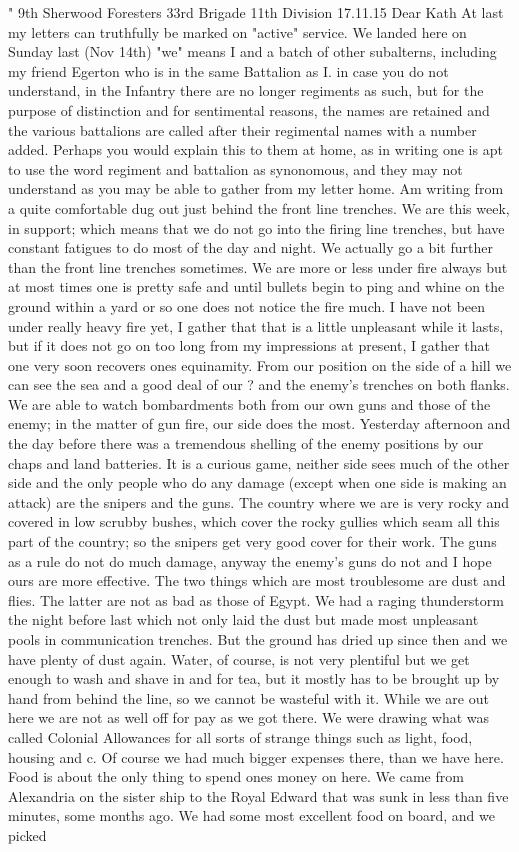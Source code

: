 " 9th Sherwood Foresters
    33rd Brigade
    11th Division 17.11.15
Dear Kath
    At last my letters can truthfully be marked on "active" service. We landed here on Sunday last (Nov 14th) "we" means I and a batch of other subalterns, including my friend Egerton who is in the same Battalion as I. in case you do not understand, in the Infantry there are no longer regiments as such, but for the purpose of distinction and for sentimental reasons, the names are retained and the various battalions are called after their regimental names with a number added. Perhaps you would explain this to them at home, as in writing one is apt to use the word regiment and battalion as synonomous, and they may not understand as you may be able to gather from my letter home. Am writing from a quite comfortable dug out just behind the front line trenches. We are this week, in support; which means that we do not go into the firing line trenches, but have constant fatigues to do most of the day and night. We actually go a bit further than the front line trenches sometimes. We are more or less under fire always but at most times one is pretty safe and until bullets begin to ping and whine on the ground within a yard or so one does not notice the fire much. I have not been under really heavy fire yet, I gather that that is a little unpleasant while it lasts, but if it does not go on too long from my impressions at present, I gather that one very soon recovers ones equinamity. From our position on the side of a hill we can see the sea and a good deal of our ? and the enemy's trenches on both flanks. We are able to watch bombardments both from our own guns and those of the enemy; in the matter of gun fire, our side does the most. Yesterday afternoon and the day before there was a tremendous shelling of the enemy positions by our chaps and land batteries. It is a curious game, neither side sees much of the other side and the only people who do any damage (except when one side is making an attack) are the snipers and the guns. The country where we are is very rocky and covered in low scrubby bushes, which cover the rocky gullies which seam all this part of the country; so the snipers get very good cover for their work. The guns as a rule do not do much damage, anyway the enemy's guns do not and I hope ours are more effective. The two things which are most troublesome are dust and flies. The latter are not as bad as those of Egypt. We had a raging thunderstorm the night before last which not only laid the dust but made most unpleasant pools in communication trenches. But the ground has dried up since then and we have plenty of dust again. Water, of course, is not very plentiful but we get enough to wash and shave in and for tea, but it mostly has to be brought up by hand from behind the line, so we cannot be wasteful with it. While we are out here we are not as well off for pay as we got there. We were drawing what was called Colonial Allowances for all sorts of strange things such as light, food, housing and c. Of course we had much bigger expenses there, than we have here. Food is about the only thing to spend ones money on here. We came from Alexandria on the sister ship to the Royal Edward that was sunk in less than five minutes, some months ago. We had some most excellent food on board, and we picked 